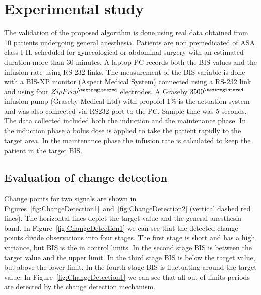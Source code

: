 \section{Experimental study}
The validation of the proposed algorithm is done using real data
obtained from 10 patients undergoing general anesthesia. Patients are non
premedicated of ASA class I-II, scheduled for gynecological or
abdominal surgery with an estimated duration more than 30 minutes. A
laptop PC records both the BIS values and the infusion rate using
RS-232 links. The measurement of the BIS variable is done with a
{BIS-XP\texttrademark} monitor (Aspect Medical System) connected using
a RS-232 link and using four $ZipPrep^{\textregistered}$ electrodes. A
Graseby $3500^{\textregistered}$ infusion pump (Graseby Medical Ltd) with
propofol 1\% is the actuation system and was also connected via RS232
port to the PC. Sample time was 5 seconds.
The data collected included both the induction and the maintenance phase.
%
In the induction phase a bolus dose is applied to take the patient
rapidly to the target area. In the maintenance phase the infusion rate
is calculated to keep the patient in the target BIS.

\subsection{Evaluation of change detection}
Change points for two signals are shown in
Figures~\ref{fig:ChangeDetection1}~and~\ref{fig:ChangeDetection2} (vertical dashed red lines).
%
%
The horizontal lines depict the target value and the general
anesthesia band.  In Figure~\ref{fig:ChangeDetection1} we can see that
the detected change points divide observations into four stages. The
first stage is short and has a high variance, but BIS is the in
control limits. In the second stage BIS is between the target value
and the upper limit. In the third stage BIS is below the target value,
but above the lower limit. In the fourth stage BIS is fluctuating
around the target value.  In Figure~\ref{fig:ChangeDetection1} we can
see that all out of limits periods are detected by the change
detection mechanism.


